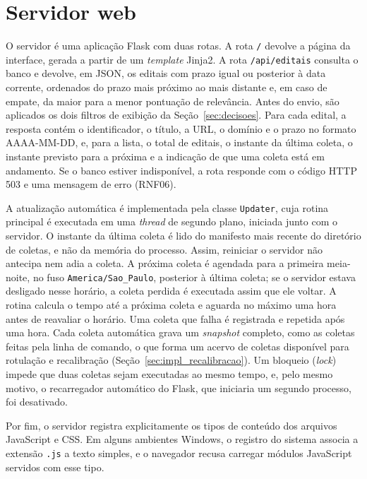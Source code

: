 \section{Servidor web}
\label{sec:impl_servidor}

O servidor é uma aplicação Flask com duas rotas. A rota \texttt{/} devolve a
página da interface, gerada a partir de um \textit{template} Jinja2. A rota
\texttt{/api/editais} consulta o banco e devolve, em JSON, os editais com
prazo igual ou posterior à data corrente, ordenados do prazo mais próximo ao
mais distante e, em caso de empate, da maior para a menor pontuação de
relevância. Antes do envio, são aplicados os dois filtros de exibição da
Seção~\ref{sec:decisoes}. Para cada edital, a resposta contém o
identificador, o título, a URL, o domínio e o prazo no formato AAAA-MM-DD, e,
para a lista, o total de editais, o instante da última coleta, o instante
previsto para a próxima e a indicação de que uma coleta está em andamento.
Se o banco estiver indisponível, a rota responde com o código HTTP 503 e uma
mensagem de erro (RNF06).

A atualização automática é implementada pela classe \texttt{Updater}, cuja
rotina principal é executada em uma \textit{thread} de segundo plano, iniciada
junto com o servidor. O instante da última coleta é lido do manifesto mais
recente do diretório de coletas, e não da memória do processo. Assim,
reiniciar o servidor não antecipa nem adia a coleta. A próxima coleta é
agendada para a primeira meia-noite, no fuso \texttt{America/Sao\_Paulo},
posterior à última coleta; se o servidor estava desligado nesse horário, a
coleta perdida é executada assim que ele voltar. A
rotina calcula o tempo até a próxima coleta e aguarda no máximo uma hora antes
de reavaliar o horário. Uma coleta que falha é registrada e repetida após uma
hora. Cada coleta automática grava um \textit{snapshot} completo, como as
coletas feitas pela linha de comando, o que forma um acervo de coletas
disponível para rotulação e recalibração (Seção~\ref{sec:impl_recalibracao}).
Um bloqueio (\textit{lock}) impede que duas coletas sejam executadas ao
mesmo tempo, e, pelo mesmo motivo, o recarregador automático do Flask, que
iniciaria um segundo processo, foi desativado.

Por fim, o servidor registra explicitamente os tipos de conteúdo dos arquivos
JavaScript e CSS. Em alguns ambientes Windows, o registro do sistema associa a
extensão \texttt{.js} a texto simples, e o navegador recusa carregar módulos
JavaScript servidos com esse tipo.

